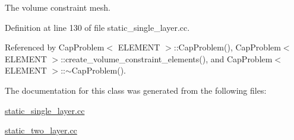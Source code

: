 The volume constraint mesh. 



Definition at line 130 of file static\+\_\+single\+\_\+layer.\+cc.



Referenced by Cap\+Problem$<$ E\+L\+E\+M\+E\+N\+T $>$\+::\+Cap\+Problem(), Cap\+Problem$<$ E\+L\+E\+M\+E\+N\+T $>$\+::create\+\_\+volume\+\_\+constraint\+\_\+elements(), and Cap\+Problem$<$ E\+L\+E\+M\+E\+N\+T $>$\+::$\sim$\+Cap\+Problem().



The documentation for this class was generated from the following files\+:\begin{DoxyCompactItemize}
\item 
\hyperlink{static__single__layer_8cc}{static\+\_\+single\+\_\+layer.\+cc}\item 
\hyperlink{static__two__layer_8cc}{static\+\_\+two\+\_\+layer.\+cc}\end{DoxyCompactItemize}
